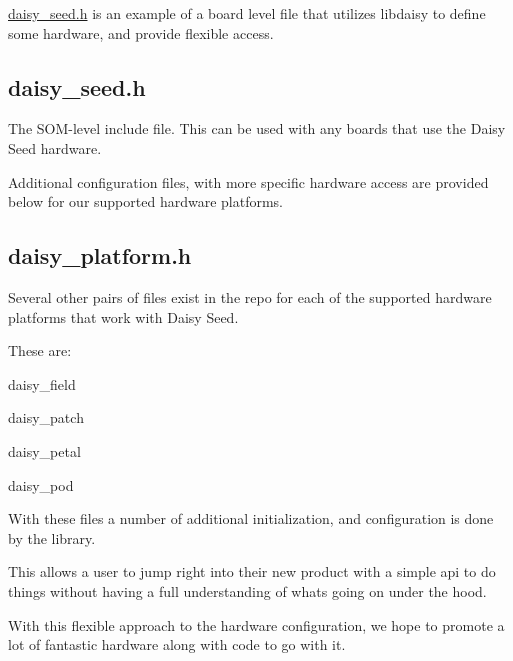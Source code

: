 {\ttfamily \hyperlink{daisy__seed_8h_source}{daisy\+\_\+seed.\+h}} is an example of a board level file that utilizes libdaisy to define some hardware, and provide flexible access.\hypertarget{index_autotoc_md5}{}\subsection{daisy\+\_\+seed.\+h}\label{index_autotoc_md5}
The S\+O\+M-\/level include file. This can be used with any boards that use the Daisy Seed hardware.

Additional configuration files, with more specific hardware access are provided below for our supported hardware platforms.\hypertarget{index_autotoc_md6}{}\subsection{daisy\+\_\+platform.\+h}\label{index_autotoc_md6}
Several other pairs of files exist in the repo for each of the supported hardware platforms that work with Daisy Seed.

These are\+:
\begin{DoxyItemize}
\item daisy\+\_\+field
\item daisy\+\_\+patch
\item daisy\+\_\+petal
\item daisy\+\_\+pod
\end{DoxyItemize}

With these files a number of additional initialization, and configuration is done by the library.

This allows a user to jump right into their new product with a simple api to do things without having a full understanding of what\textquotesingle{}s going on under the hood. 



With this flexible approach to the hardware configuration, we hope to promote a lot of fantastic hardware along with code to go with it. 